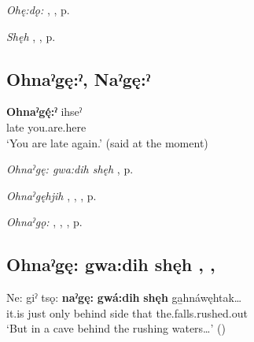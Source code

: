 \begin{CayugaRelated}
\item \textit{Ohę:dǫ:} , , p. \pageref{p:[ohę:dǫ:]}\\
\item \textit{Shęh} , , p. \pageref{p:[shęh] `because’}
\end{CayugaRelated}


\subsection*{\textbf{Ohnaˀgę:ˀ, Naˀgę:ˀ} } \label{p:[ohnaˀgę:ˀ]}

\ea
\label{ex:opart12}
\gll \textbf{Ohnaˀgę́:ˀ} ihseˀ\\
late you.are.here\\
\glt ‘You are late again.’ (said at the moment)
\z

\begin{CayugaRelated}
\item \textit{Ohnaˀgę: gwa:dih shęh} , p. \pageref{p:[ohnaˀgę: gwa:dih shęh]}\\
\item \textit{Ohnaˀgęhjih} , , , p. \pageref{p:[ohnaˀgęhjih] ‘late’}\\
\item \textit{Ohnaˀgǫ:} , , , p. \pageref{p:[ohnaˀgǫ:]}
\end{CayugaRelated}


\subsection*{\textbf{Ohnaˀgę: gwa:dih shęh} , , } \label{p:[ohnaˀgę: gwa:dih shęh]}

\ea
\label{ex:opart13}
\gll Ne: giˀ tsǫ: \textbf{naˀgę:} \textbf{gwá:dih} \textbf{shęh} ga̱hnáwęhtak…\\
it.is just only behind side that the.falls.rushed.out\\
\glt ‘But in a cave behind the rushing waters…’ (\cite{carrier_legends_2013})
\z

